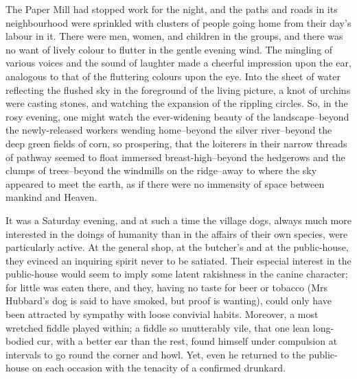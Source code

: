 The Paper Mill had stopped work for the night, and the paths and roads
in its neighbourhood were sprinkled with clusters of people going home
from their day’s labour in it. There were men, women, and children in
the groups, and there was no want of lively colour to flutter in the
gentle evening wind. The mingling of various voices and the sound of
laughter made a cheerful impression upon the ear, analogous to that of
the fluttering colours upon the eye. Into the sheet of water reflecting
the flushed sky in the foreground of the living picture, a knot of
urchins were casting stones, and watching the expansion of the rippling
circles. So, in the rosy evening, one might watch the ever-widening
beauty of the landscape--beyond the newly-released workers wending
home--beyond the silver river--beyond the deep green fields of corn, so
prospering, that the loiterers in their narrow threads of pathway seemed
to float immersed breast-high--beyond the hedgerows and the clumps of
trees--beyond the windmills on the ridge--away to where the sky appeared
to meet the earth, as if there were no immensity of space between
mankind and Heaven.

It was a Saturday evening, and at such a time the village dogs, always
much more interested in the doings of humanity than in the affairs of
their own species, were particularly active. At the general shop, at
the butcher’s and at the public-house, they evinced an inquiring spirit
never to be satiated. Their especial interest in the public-house would
seem to imply some latent rakishness in the canine character; for little
was eaten there, and they, having no taste for beer or tobacco (Mrs
Hubbard’s dog is said to have smoked, but proof is wanting), could only
have been attracted by sympathy with loose convivial habits. Moreover,
a most wretched fiddle played within; a fiddle so unutterably vile, that
one lean long-bodied cur, with a better ear than the rest, found himself
under compulsion at intervals to go round the corner and howl. Yet, even
he returned to the public-house on each occasion with the tenacity of a
confirmed drunkard.

